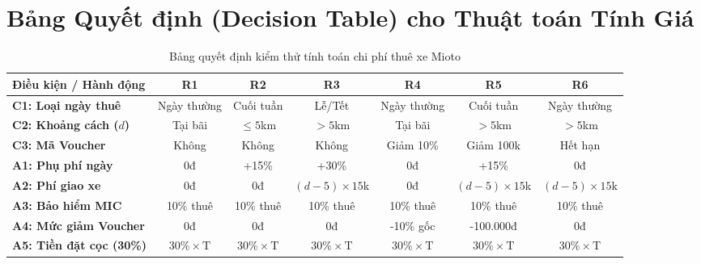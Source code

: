 \documentclass[12pt,a4paper,oneside]{report}
\begin{document}
\section{Bảng Quyết định (Decision Table) cho Thuật toán Tính Giá}
\begin{table}[ht]
  \centering\footnotesize
  \begin{tabularx}{\textwidth}{Xcccccc}
    \toprule
    \textbf{Điều kiện / Hành động} & \textbf{R1} & \textbf{R2} & \textbf{R3} & \textbf{R4} & \textbf{R5} & \textbf{R6} \\
    \midrule
    \textbf{C1: Loại ngày thuê} & Ngày thường & Cuối tuần & Lễ/Tết & Ngày thường & Cuối tuần & Ngày thường \\
    \textbf{C2: Khoảng cách ($d$)} & Tại bãi & $\le 5$km & $> 5$km & Tại bãi & $> 5$km & $> 5$km \\
    \textbf{C3: Mã Voucher} & Không & Không & Không & Giảm 10\% & Giảm 100k & Hết hạn \\
    \midrule
    \textbf{A1: Phụ phí ngày} & 0đ & +15\% & +30\% & 0đ & +15\% & 0đ \\
    \textbf{A2: Phí giao xe} & 0đ & 0đ & $(d-5)\times 15$k & 0đ & $(d-5)\times 15$k & $(d-5)\times 15$k \\
    \textbf{A3: Bảo hiểm MIC} & 10\% thuê & 10\% thuê & 10\% thuê & 10\% thuê & 10\% thuê & 10\% thuê \\
    \textbf{A4: Mức giảm Voucher} & 0đ & 0đ & 0đ & -10\% gốc & -100.000đ & 0đ \\
    \textbf{A5: Tiền đặt cọc (30\%)} & $30\% \times \text{T}$ & $30\% \times \text{T}$ & $30\% \times \text{T}$ & $30\% \times \text{T}$ & $30\% \times \text{T}$ & $30\% \times \text{T}$ \\
    \bottomrule
  \end{tabularx}
  \caption{Bảng quyết định kiểm thử tính toán chi phí thuê xe Mioto}
  \label{tab:decision_pricing}
\end{table}
\end{document}

